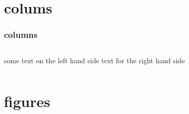 \documentclass{beamer}
\begin{document}
% 
\section{colums}
\begin{frame}
  \tableofcontents[currentsection]
\end{frame}

% 
\begin{frame}
  \frametitle{columns}
  \begin{columns}
    \column{6cm}
    some text on the left hand side
    \column{4cm}
    text for the right hand side
  \end{columns}
\end{frame}

% 
\section{figures}
\begin{frame}
  \tableofcontents[currentsection]
\end{frame}
\end{document}
